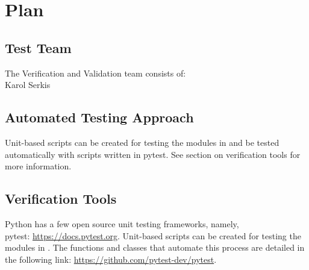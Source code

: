 \documentclass[12pt, titlepage]{article}
\begin{document}

\section{Plan}
	

\subsection{Test Team}

The Verification and Validation team consists of:\\
Karol Serkis

\subsection{Automated Testing Approach}

Unit-based scripts can be created for testing the modules in \progname{}and be 
tested automatically with scripts written in pytest. 
See section on verification tools for more information.

\subsection{Verification Tools}

Python has a few open source unit testing frameworks, namely, \\pytest: 
\url{https://docs.pytest.org}. 
Unit-based scripts can be created for testing the modules in \progname. 
The functions and classes that automate 
this process are detailed in the following link: 
\url{https://github.com/pytest-dev/pytest}.\\

		
\end{document}
